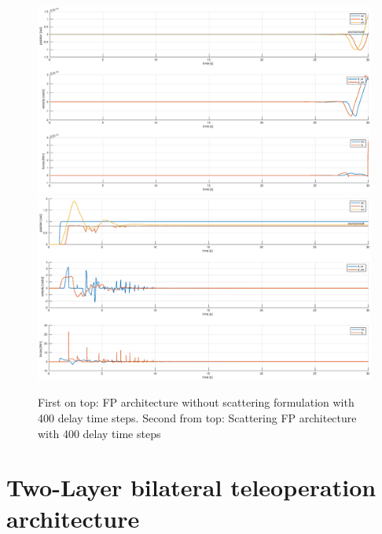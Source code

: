\documentclass[a4paper,12pt]{article}
\begin{document}
\begin{figure}[H]
    \hspace*{-3.5cm}
    \includegraphics[scale=0.45]{images/scatt_high_delay.eps}
    \qquad
    \hspace*{-3.5cm}
    \includegraphics[scale=0.45]{images/scatt_high_delay_comp.eps}
    \caption{First on top: FP architecture without scattering formulation with 400 delay time steps. Second from top: Scattering FP architecture with 400 delay time steps}
    \label{fig:delay_comp}
\end{figure}

\newpage
\section{Two-Layer bilateral teleoperation architecture}
\end{document}
